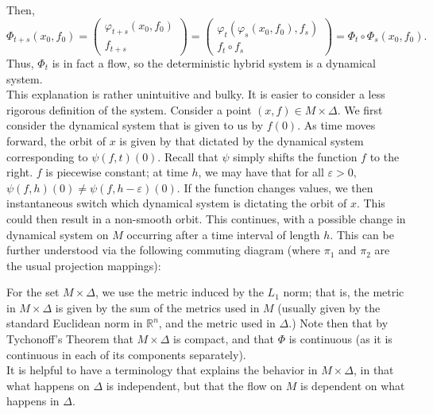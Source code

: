 \documentclass[11pt]{article}
\begin{document}
Then,
$$\Phi_{t+s}(x_0,f_0) 
= 
\left (
\begin{array}{cc}
\varphi_{t+s} (x_0, f_0) \\
f_{t+s}
\end{array} \right ) 
 = 
\left (
\begin{array}{cc}
\varphi_t (\varphi_s(x_0, f_0), f_s) \\
f_t \circ f_s
\end{array} \right ) 
= 
\Phi_t \circ \Phi_s(x_0,f_0) .$$
Thus, $\Phi_t$ is in fact a flow, so the deterministic hybrid system is a dynamical system.\\
\indent This explanation is rather unintuitive and bulky.  It is easier to consider a less rigorous definition of the system.  Consider a point $(x,f)\in M\times\Delta.$  We first consider the dynamical system that is given to us by $f(0)$.  As time moves forward, the orbit of $x$ is given by that dictated by the dynamical system corresponding to $\psi(f,t)(0)$.  Recall that $\psi$ simply shifts the function $f$ to the right.  $f$ is piecewise constant; at time $h$, we may have that for all $\varepsilon>0,$ $\psi(f,h)(0)\not = \psi(f,h-\varepsilon)(0).$  If the function changes values, we then instantaneous switch which dynamical system is dictating the orbit of $x$.  This could then result in a non-smooth orbit.  This continues, with a possible change in dynamical system on $M$ occurring after a time interval of length $h$. This can be further understood via the following commuting diagram (where $\pi_1$ and $\pi_2$ are the usual projection mappings):
\begin{center}
\end{center}

\indent For the set $M\times\Delta$, we use the metric induced by the \textbf{$L_1$} norm; that is, the metric in $M\times \Delta$ is given by the sum of the metrics used in $M$ (usually given by the standard Euclidean norm in $\mathbb{R}^n$, and the metric used in $\Delta$.)  Note then that by Tychonoff's  Theorem that $M\times \Delta$ is compact, and that $\Phi$ is continuous (as it is continuous in each of its components separately).  \\
\indent It is helpful to have a terminology that explains the behavior in $M\times\Delta$, in that what happens on $\Delta$ is independent, but that the flow on $M$ is dependent on what happens in $\Delta$.  
\end{document}
